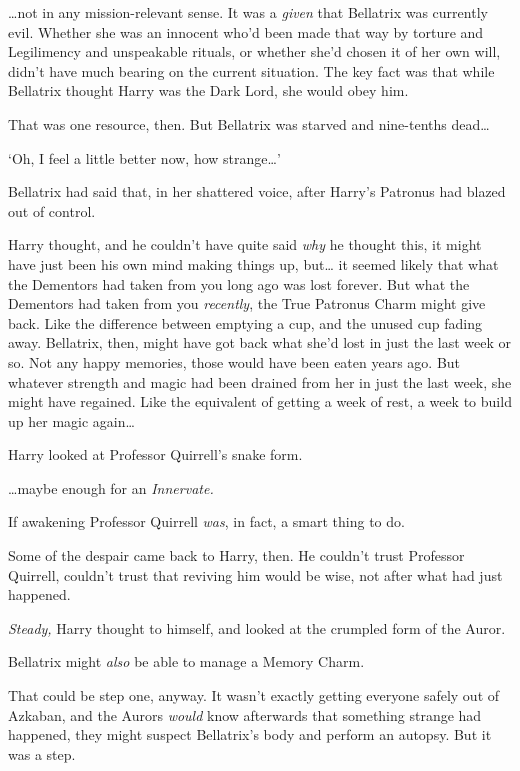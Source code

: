{\ldots}not in any mission-relevant sense. It was a \emph{given} that Bellatrix was currently evil. Whether she was an innocent who'd been made that way by torture and Legilimency and unspeakable rituals, or whether she'd chosen it of her own will, didn't have much bearing on the current situation. The key fact was that while Bellatrix thought Harry was the Dark Lord, she would obey him.

That was one resource, then. But Bellatrix was starved and nine-tenths dead{\ldots}

`Oh, I feel a little better now, how strange{\ldots}'

Bellatrix had said that, in her shattered voice, after Harry's Patronus had blazed out of control.

Harry thought, and he couldn't have quite said \emph{why} he thought this, it might have just been his own mind making things up, but{\ldots} it seemed likely that what the Dementors had taken from you long ago was lost forever. But what the Dementors had taken from you \emph{recently}, the True Patronus Charm might give back. Like the difference between emptying a cup, and the unused cup fading away. Bellatrix, then, might have got back what she'd lost in just the last week or so. Not any happy memories, those would have been eaten years ago. But whatever strength and magic had been drained from her in just the last week, she might have regained. Like the equivalent of getting a week of rest, a week to build up her magic again{\ldots}

Harry looked at Professor Quirrell's snake form.

{\ldots}maybe enough for an \emph{Innervate.}

If awakening Professor Quirrell \emph{was}, in fact, a smart thing to do.

Some of the despair came back to Harry, then. He couldn't trust Professor Quirrell, couldn't trust that reviving him would be wise, not after what had just happened.

\emph{Steady,} Harry thought to himself, and looked at the crumpled form of the Auror.

Bellatrix might \emph{also} be able to manage a Memory Charm.

That could be step one, anyway. It wasn't exactly getting everyone safely out of Azkaban, and the Aurors \emph{would} know afterwards that something strange had happened, they might suspect Bellatrix's body and perform an autopsy. But it was a step.


